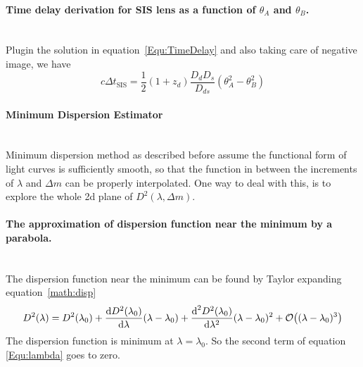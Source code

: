  \paragraph{Time delay derivation for SIS lens as a function of $ \theta_{A}$ and $ \theta_{B}$.}\hspace{0pt}\\
 Plugin the solution in equation~\ref{Equ:TimeDelay} and also taking care of negative image, we have
 \begin{equation}
	 c \Delta t_\text{SIS} = \frac{1}{2} (1 + z_d) \frac{D_d D_s}{D_{ds}} (\theta_A^2 -\theta_B^2)
	 \label{math:timeDelaySIS}
 \end{equation}
  
  
 \paragraph{Minimum Dispersion Estimator}\hspace{0pt} \\
  Minimum dispersion method as described before assume the functional form of light curves is sufficiently smooth, so that the function in between the increments of $\lambda$ and $\Delta m$ can be properly interpolated. One way to deal with this, is to explore the whole 2d plane of $D^2(\lambda, \Delta m)$.
  
  
  \paragraph{The approximation of dispersion function near the minimum by a parabola.}\label{sec:parabola}\hspace{0pt}\\
  The dispersion function near the minimum can be found by Taylor expanding equation~\ref{math:disp}
  \begin{equation}
	  D^2(\lambda)=D^2(\lambda_{0}) +\frac{\text{d}D^2(\lambda_{0})}{\text{d}\lambda}(\lambda- \lambda_{0}) + \frac{\text{d}^2 D^2(\lambda_{0})}{\text{d}\lambda^2}(\lambda - \lambda_{0})^2 +  \order{(\lambda-\lambda_0)^3}
  \label{Equ:lambda}
  \end{equation}
  The dispersion function is minimum at $ \lambda= \lambda_{0} $. So the second term of equation \ref{Equ:lambda} goes to zero.
 
